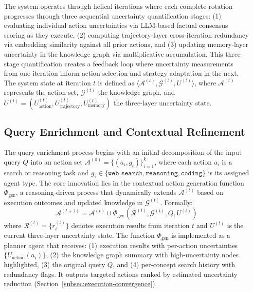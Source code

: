 \documentclass{article}
\begin{document}
The system operates through helical iterations where each complete rotation progresses through three sequential uncertainty quantification stages: (1) evaluating individual action uncertainties via LLM-based factual consensus scoring as they execute, (2) computing trajectory-layer cross-iteration redundancy via embedding similarity against all prior actions, and (3) updating memory-layer uncertainty in the knowledge graph via multiplicative accumulation. This three-stage quantification creates a feedback loop where uncertainty measurements from one iteration inform action selection and strategy adaptation in the next. The system state at iteration $t$ is defined as $\langle \mathcal{A}^{(t)}, \mathcal{G}^{(t)}, U^{(t)} \rangle$, where $\mathcal{A}^{(t)}$ represents the action set, $\mathcal{G}^{(t)}$ the knowledge graph, and $U^{(t)} = (U_{\text{action}}^{(t)}, U_{\text{trajectory}}^{(t)}, U_{\text{memory}}^{(t)})$ the three-layer uncertainty state.

\subsection{Query Enrichment and Contextual Refinement}
\label{subsec:query-enrichment}

The query enrichment process begins with an initial decomposition of the input query $Q$ into an action set $\mathcal{A}^{(0)} = \{(a_i, g_i)\}_{i=1}^{k}$, where each action $a_i$ is a search or reasoning task and $g_i \in \{\texttt{web\_search}, \texttt{reasoning}, \texttt{coding}\}$ is its assigned agent type. The core innovation lies in the contextual action generation function $\Phi_{\text{gen}}$, a reasoning-driven process that dynamically extends $\mathcal{A}^{(t)}$ based on execution outcomes and updated knowledge in $\mathcal{G}^{(t)}$. Formally:
\begin{equation}
\mathcal{A}^{(t+1)} = \mathcal{A}^{(t)} \cup \Phi_{\text{gen}}\left( \mathcal{R}^{(t)}, \mathcal{G}^{(t)}, Q, U^{(t)} \right)
\end{equation}
where $\mathcal{R}^{(t)} = \{r_i^{(t)}\}$ denotes execution results from iteration $t$ and $U^{(t)}$ is the current three-layer uncertainty state. The function $\Phi_{\text{gen}}$ is implemented as a planner agent that receives: (1) execution results with per-action uncertainties $\{U_{\text{action}}(a_i)\}$, (2) the knowledge graph summary with high-uncertainty nodes highlighted, (3) the original query $Q$, and (4) per-concept search history with redundancy flags. It outputs targeted actions ranked by estimated uncertainty reduction (Section~\ref{subsec:execution-convergence}).
\end{document}
